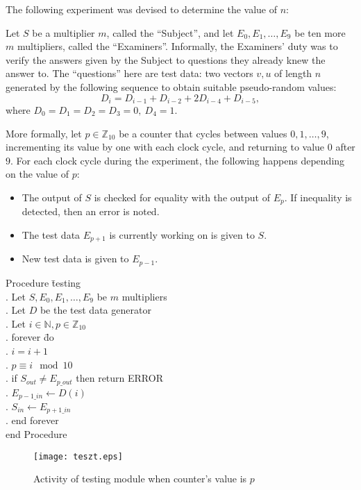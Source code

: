 \documentclass[11pt,twoside]{article}
\begin{document}
The following experiment was devised to determine the value of $n$:

Let $S$ be a multiplier $m$, called the ``Subject'', and let $E_{0},E_{1},\ldots ,E_{9}$ be ten more $m$ multipliers, called the ``Examiners''. Informally, the Examiners' duty was to verify the answers given by the Subject to questions they already knew the answer to. The ``questions'' here are test data: two vectors $v,u$ of length $n$ generated by the following sequence to obtain suitable pseudo-random values:
\[
D_{i}=D_{i-1}+D_{i-2}+2D_{i-4}+D_{i-5},
\]
where $D_{0}=D_{1}=D_{2}=D_{3}=0, \ D_{4}=1$.

More formally, let $p \in \mathbb{Z}_{10}$ be a counter that cycles between values $0,1, \ldots,9$, incrementing its value by one with each clock cycle, and returning to value $0$ after $9$. For each clock cycle during the experiment, the following happens depending on the value of $p$:
\begin{itemize}
\item The output of $S$ is checked for equality with the output of $E_{p}$. If inequality is detected, then an error is noted.
\item The test data $E_{p+1}$ is currently working on is given to $S$.
\item New test data is given to $E_{p-1}$.
\end{itemize}

\begin{tabbing}
Procedure \= testing \\
. Let $S,E_{0},E_{1},\ldots,E_{9}$ be $m$ multipliers \\
. Let $D$ be the test data generator \\
. Let $i \in \mathbb{N}, p \in \mathbb{Z}_{10}$ \\
. forever \= do \\
\> . $i=i+1$ \\
\> . $p \equiv i \mod{10}$ \\
\> . if $S_{out} \neq E_{p\_out}$ then return ERROR \\
\> . $E_{p-1\_in} \leftarrow D(i)$ \\
\> . $S_{in} \leftarrow E_{p+1\_in}$ \\
. end forever \\
end Procedure \\
\end{tabbing}

\begin{figure}[h!]
\centering
\texttt{[image: teszt.eps]}
\caption{Activity of testing module when counter's value is $p$}
\end{figure}
\end{document}
